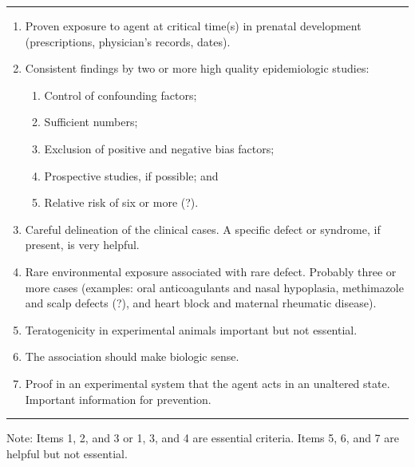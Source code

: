 \def\Hrule{\vskip3pt\hrule\vskip3pt}
\begin{table}[!b]
\mediumlarge
{}

\Hrule
\begin{enumerate}

\item Proven exposure to agent at critical time(s) in prenatal development (prescriptions, physician's
records, dates).

\item Consistent findings by two or more high quality epidemiologic studies:
\begin{enumerate}
\itemindent 4pt
\item Control of confounding factors;
\item Sufficient numbers;
\item Exclusion of positive and negative bias factors;
\item Prospective studies, if possible; and
\item Relative risk of six or more (?).
\end{enumerate}

\item Careful delineation of the clinical cases. A specific defect or syndrome, if present, is very
helpful.
\item Rare environmental exposure associated with rare defect. Probably three or more cases
(examples: oral anticoagulants and nasal hypoplasia,
methimazole and scalp defects (?), and heart block and
maternal rheumatic disease).
\item Teratogenicity in experimental animals important but not essential.
\item The association should make biologic sense.
\item Proof in an experimental system that the agent acts in an unaltered state. Important information
for prevention.
\end{enumerate}

\Hrule
{\noindent\normalsize
Note: Items 1, 2, and 3 or 1, 3, and 4 are essential criteria. Items 5, 6, and 7 are helpful but not essential.
\par}
\end{table}


\def\tblh#1{\textit{#1}\\}
\def\tbll#1{\hspace*{1pc}#1\\}



